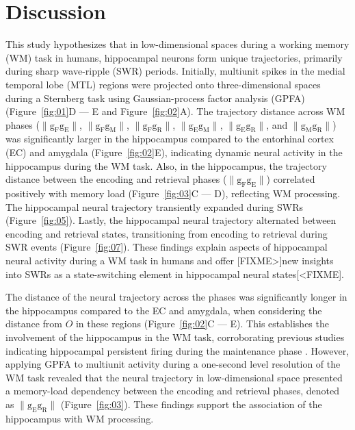\section{Discussion}
This study hypothesizes that in low-dimensional spaces during a working memory (WM) task in humans, hippocampal neurons form unique trajectories, primarily during sharp wave-ripple (SWR) periods. Initially, multiunit spikes in the medial temporal lobe (MTL) regions were projected onto three-dimensional spaces during a Sternberg task using Gaussian-process factor analysis (GPFA) (Figure~\ref{fig:01}D --- E and Figure~\ref{fig:02}A). The trajectory distance across WM phases ($\mathrm{\lVert g_{F}g_{E} \rVert}$, $\mathrm{\lVert g_{F}g_{M} \rVert}$, $\mathrm{\lVert g_{F}g_{R} \rVert}$, $\mathrm{\lVert g_{E}g_{M} \rVert}$, $\mathrm{\lVert g_{E}g_{R} \rVert}$, and $\mathrm{\lVert g_{M}g_{R} \rVert}$) was significantly larger in the hippocampus compared to the entorhinal cortex (EC) and amygdala (Figure~\ref{fig:02}E), indicating dynamic neural activity in the hippocampus during the WM task. Also, in the hippocampus, the trajectory distance between the encoding and retrieval phases ($\mathrm{\lVert g_{F}g_{E} \rVert}$) correlated positively with memory load (Figure~\ref{fig:03}C --- D), reflecting WM processing. The hippocampal neural trajectory transiently expanded during SWRs (Figure~\ref{fig:05}). Lastly, the hippocampal neural trajectory alternated between encoding and retrieval states, transitioning from encoding to retrieval during SWR events (Figure~\ref{fig:07}). These findings explain aspects of hippocampal neural activity during a WM task in humans and offer [FIXME>]new insights into SWRs as a state-switching element in hippocampal neural states[<FIXME].

The distance of the neural trajectory across the phases was significantly longer in the hippocampus compared to the EC and amygdala, when considering the distance from $O$ in these regions (Figure~\ref{fig:02}C --- E). This establishes the involvement of the hippocampus in the WM task, corroborating previous studies indicating hippocampal persistent firing during the maintenance phase \cite{boran_persistent_2019} \cite{kaminski_persistently_2017} \cite{kornblith_persistent_2017} \cite{faraut_dataset_2018}. However, applying GPFA to multiunit activity during a one-second level resolution of the WM task revealed that the neural trajectory in low-dimensional space presented a memory-load dependency between the encoding and retrieval phases, denoted as $\mathrm{\lVert g_{E}g_{R} \rVert}$ (Figure~\ref{fig:03}). These findings support the association of the hippocampus with WM processing.

